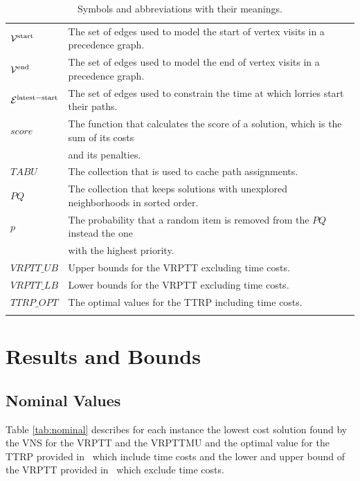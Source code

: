 \begin{longtable}{ll}
$\mathcal V^{\rm start}$ & The set of edges used to model the start of vertex visits in a precedence graph. \\
$\mathcal V^{\rm end}$ & The set of edges used to model the end of vertex visits in a precedence graph. \\
$\mathcal E^{\rm latest-start}$ & The set of edges used to constrain the time at which lorries start their paths. \\
$score$ & The function that calculates the score of a solution, which is the sum of its costs \\
&  and its penalties. \\
$TABU$ & The collection that is used to cache path assignments. \\
$PQ$ & The collection that keeps solutions with unexplored neighborhoods in sorted order. \\
$p$ & The probability that a random item is removed from the $PQ$ instead the one  \\
& with the highest priority. \\
$VRPTT\_UB$ & Upper bounds for the VRPTT excluding time costs. \\
$VRPTT\_LB$ & Lower bounds for the VRPTT excluding time costs. \\
$TTRP\_OPT$ & The optimal values for the TTRP including time costs. \\

\bottomrule
\caption{Symbols and abbreviations with their meanings.}
\label{tab:symbols}
\end{longtable}



\section{Results and Bounds}
\subsection{Nominal Values}
\label{sec:bounds}

Table \ref{tab:nominal} describes for each instance the lowest cost solution found by the VNS for the VRPTT and the VRPTTMU  and  the optimal value for the TTRP provided in~\cite{drexl2011branch} which include time costs  and the lower and upper bound of the VRPTT provided in~\cite{drexl2014bandc} which exclude time costs.




